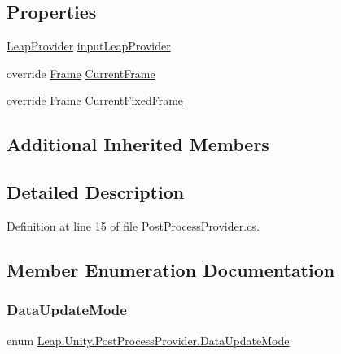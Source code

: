 \subsection*{Properties}
\begin{DoxyCompactItemize}
\item 
\mbox{\hyperlink{class_leap_1_1_unity_1_1_leap_provider}{Leap\+Provider}} \mbox{\hyperlink{class_leap_1_1_unity_1_1_post_process_provider_ad036d0a5c3927ff97f05be7508e1baeb}{input\+Leap\+Provider}}
\item 
override \mbox{\hyperlink{class_leap_1_1_frame}{Frame}} \mbox{\hyperlink{class_leap_1_1_unity_1_1_post_process_provider_a23159b5c251387449ee1ec0cc46af7fe}{Current\+Frame}}
\item 
override \mbox{\hyperlink{class_leap_1_1_frame}{Frame}} \mbox{\hyperlink{class_leap_1_1_unity_1_1_post_process_provider_a9d8244092e38b8271add70efdb842709}{Current\+Fixed\+Frame}}
\end{DoxyCompactItemize}
\subsection*{Additional Inherited Members}


\subsection{Detailed Description}


Definition at line 15 of file Post\+Process\+Provider.\+cs.



\subsection{Member Enumeration Documentation}
\mbox{\label{class_leap_1_1_unity_1_1_post_process_provider_a00f92d69e8bdf46e32c5e8eda793e6c3}} 
\subsubsection{\texorpdfstring{DataUpdateMode}{DataUpdateMode}}
{\footnotesize\ttfamily enum \mbox{\hyperlink{class_leap_1_1_unity_1_1_post_process_provider_a00f92d69e8bdf46e32c5e8eda793e6c3}{Leap.\+Unity.\+Post\+Process\+Provider.\+Data\+Update\+Mode}}\hspace{0.3cm}{\ttfamily [strong]}}

